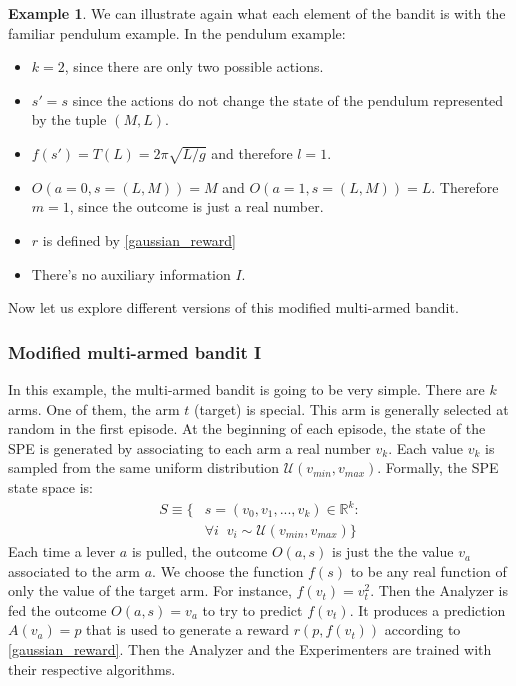 \documentclass[11pt,a4paper,twoside]{report}
\newcommand{\+}{\textnormal{+} }
\theoremstyle{definition}
\newtheorem{myex}[mythm]{Example}
\numberwithin{equation}{chapter}
\begin{document}
\begin{myex}
  We can illustrate again what each element of the bandit is with the familiar
  pendulum example. In the pendulum example:
  \begin{itemize}
    \item $k=2$, since there are only two possible actions.
    \item $s'=s$ since the actions do not change the state of the pendulum 
    represented by the tuple $(M,L)$.
    \item $f(s')=T(L)=2\pi\sqrt{L/g}$ and therefore $l=1$.
    \item $O(a=0,s=(L,M))=M$ and $O(a=1, s=(L,M))=L$. Therefore $m=1$, since 
    the outcome is just a real number.
    \item $r$ is defined by \eqref{gaussian_reward}
    \item There's no auxiliary information $I$.
  \end{itemize}
  
\end{myex}

Now let us explore different versions of this modified multi-armed bandit.

\subsubsection{Modified multi-armed bandit I}

  In this example, the multi-armed bandit is going to be very simple. There are
  $k$ arms. One of them, the arm $t$ (target) is special. This arm is generally
  selected at random in the first episode. At the beginning of each episode, the
  state of the SPE is generated by associating to each arm a real number $v_k$.
  Each value $v_k$ is sampled from the same uniform distribution
  $\mathcal{U}(v_{min},v_{max})$. Formally, the SPE state space is:
  \begin{align}
    S\equiv\{&s=(v_0, v_1,...,v_k) \in \mathbb{R}^k: \\
    & \forall i \; \; v_i \sim \mathcal{U}(v_{min},v_{max})
    \}
  \end{align}
  Each time a lever $a$ is pulled, the outcome $O(a,s)$ is just the the value
  $v_a$ associated to the arm $a$. We choose the function $f(s)$ to be any real
  function of only the value of the target arm. For instance, $f(v_t)=v_t^2$.
  Then the Analyzer is fed the outcome $O(a,s)=v_a$ to try to predict $f(v_t)$.
  It produces a prediction $A(v_a)=p$ that is used to generate a reward
  $r(p,f(v_t))$ according to \eqref{gaussian_reward}. Then the Analyzer and the
  Experimenters are trained with their respective algorithms.
\end{document}
